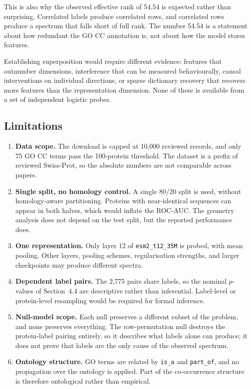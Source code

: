 \documentclass[11pt,a4paper]{article}
\begin{document}
This is also why the observed effective rank of 54.54 is expected rather than
surprising. Correlated labels produce correlated rows, and correlated rows produce
a spectrum that falls short of full rank. The number 54.54 is a statement about how
redundant the GO CC annotation is, not about how the model stores features.

Establishing superposition would require different evidence: features that
outnumber dimensions, interference that can be measured behaviourally, causal
interventions on individual directions, or sparse dictionary recovery that
recovers more features than the representation dimension. None of these is
available from a set of independent logistic probes.

\subsection{Limitations}

\begin{enumerate}[leftmargin=*]
    \item \textbf{Data scope.} The download is capped at 10{,}000 reviewed
    records, and only 75 GO CC terms pass the 100-protein threshold. The dataset is
    a prefix of reviewed Swiss-Prot, so the absolute numbers are not comparable
    across papers.

    \item \textbf{Single split, no homology control.} A single 80/20 split is used,
    without homology-aware partitioning. Proteins with near-identical sequences can
    appear in both halves, which would inflate the ROC-AUC. The geometry analysis
    does not depend on the test split, but the reported performance does.

    \item \textbf{One representation.} Only layer 12 of \texttt{esm2\_t12\_35M} is
    probed, with mean pooling. Other layers, pooling schemes, regularisation
    strengths, and larger checkpoints may produce different spectra.

    \item \textbf{Dependent label pairs.} The 2{,}775 pairs share labels, so the
    nominal $p$-values of Section~4.4 are descriptive rather than inferential.
    Label-level or protein-level resampling would be required for formal inference.

    \item \textbf{Null-model scope.} Each null preserves a different subset of the
    problem, and none preserves everything. The row-permutation null destroys the
    protein-label pairing entirely, so it describes what labels alone can produce;
    it does not prove that labels are the only cause of the observed spectrum.

    \item \textbf{Ontology structure.} GO terms are related by \texttt{is\_a} and
    \texttt{part\_of}, and no propagation over the ontology is applied. Part of the
    co-occurrence structure is therefore ontological rather than empirical.
\end{enumerate}
\end{document}
